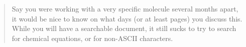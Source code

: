 \begin{framed}
\begin{quotation}
Say you were working with a very specific molecule several months apart, it would be nice to know on what days (or at least pages) you discuss this. While you will have a searchable document, it still sucks to try to search for chemical equations, or for non-ASCII characters. \cite{riboch}
\end{quotation}
\end{framed}